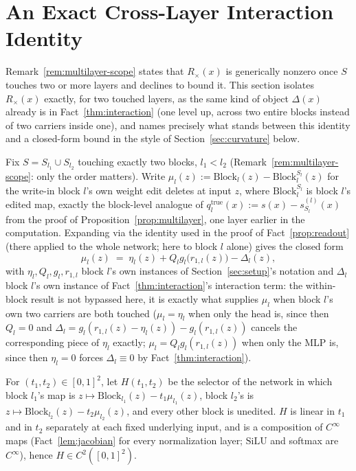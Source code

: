 \documentclass[11pt,a4paper]{article}
\begin{document}
\section{An Exact Cross-Layer Interaction Identity}
\label{sec:crossterm}

Remark~\ref{rem:multilayer-scope} states that $R_\times(x)$ is generically
nonzero once $S$ touches two or more layers and declines to bound it. This
section isolates $R_\times(x)$ exactly, for two touched layers, as the same
kind of object $\Delta(x)$ already is in Fact~\ref{thm:interaction} (one
level up, across two entire blocks instead of two carriers inside one), and
names precisely what stands between this identity and a closed-form bound in
the style of Section~\ref{sec:curvature} below.

Fix $S=S_{l_1}\cup S_{l_2}$ touching exactly two blocks, $l_1<l_2$
(Remark~\ref{rem:multilayer-scope}: only the order matters). Write
$\mu_l(z):=\mathrm{Block}_l(z)-\mathrm{Block}_l^{S_l}(z)$ for the write-in
block $l$'s own weight edit deletes at input $z$, where
$\mathrm{Block}_l^{S_l}$ is block $l$'s edited map, exactly the
block-level analogue of $q_l^{\mathrm{true}}(x):=s(x)-s_{S_l}^{(l)}(x)$ from
the proof of Proposition~\ref{prop:multilayer}, one layer earlier in the
computation. Expanding via the identity used in the proof of
Fact~\ref{prop:readout} (there applied to the whole network; here to
block $l$ alone) gives the closed form
\begin{equation}
\label{eq:mudelta}
\mu_l(z) \;=\; \eta_l(z) + Q_lg_l\bigl(r_{1,l}(z)\bigr) - \Delta_l(z),
\end{equation}
with $\eta_l,Q_l,g_l,r_{1,l}$ block $l$'s own instances of
Section~\ref{sec:setup}'s notation and $\Delta_l$ block $l$'s own
instance of Fact~\ref{thm:interaction}'s interaction term: the within-block
result is not bypassed here, it is exactly what supplies $\mu_l$ when block
$l$'s own two carriers are both touched ($\mu_l=\eta_l$ when only the head is,
since then $Q_l=0$ and $\Delta_l=g_l(r_{1,l}(z)-\eta_l(z))-g_l(r_{1,l}(z))$
cancels the corresponding piece of $\eta_l$ exactly; $\mu_l=Q_lg_l(r_{1,l}(z))$
when only the MLP is, since then $\eta_l=0$ forces $\Delta_l\equiv0$ by
Fact~\ref{thm:interaction}).

For $(t_1,t_2)\in[0,1]^2$, let $H(t_1,t_2)$ be the selector of the network in
which block $l_1$'s map is $z\mapsto\mathrm{Block}_{l_1}(z)-t_1\mu_{l_1}(z)$,
block $l_2$'s is $z\mapsto\mathrm{Block}_{l_2}(z)-t_2\mu_{l_2}(z)$, and every
other block is unedited. $H$ is linear in $t_1$ and in $t_2$ separately at
each fixed underlying input, and is a composition of $C^\infty$ maps
(Fact~\ref{lem:jacobian} for every normalization layer; $\mathrm{SiLU}$ and
softmax are $C^\infty$), hence $H\in C^2([0,1]^2)$.
\end{document}
